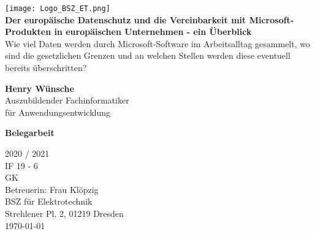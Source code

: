 \begin{titlepage}
    \begin{center}
        \texttt{[image: Logo\_BSZ\_ET.png]}\\
        \vspace*{1cm}
        {\huge\textbf{Der europäische Datenschutz und die Vereinbarkeit mit Microsoft-Produkten in europäischen Unternehmen - ein Überblick}}
        \vspace{1cm}\\
        Wie viel Daten werden durch Microsoft-Software im Arbeitsalltag gesammelt, wo sind die gesetzlichen Grenzen und an welchen Stellen werden diese eventuell bereits überschritten?
        \vspace{2cm}

            {\huge\textbf{Henry Wünsche}} \\
            Auszubildender Fachinformatiker \\ für Anwendungsentwicklung

        \vfill
        {\huge\textbf{Belegarbeit}}

        \vspace{1cm}
        {\Huge 2020 / 2021}\\
        \vspace{0.8cm}
        IF 19 - 6\\
        GK\\
        Betreuerin: Frau Klöpzig\\
        BSZ für Elektrotechnik\\
        Strehlener Pl. 2, 01219 Dresden\\
        \today

    \end{center}
\end{titlepage}
\pagebreak
